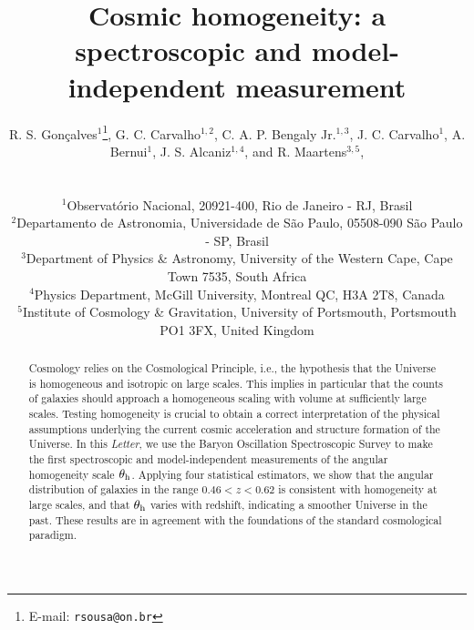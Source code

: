 \documentclass[useAMS,usenatbib]{mn2e}
\begin{document}
\title[Cosmic homogeneity: a spectroscopic and model-independent measurement]{Cosmic homogeneity: a spectroscopic and model-independent measurement}

\author[R. S. Gon\c{c}alves et al.]%
{
 \parbox{\textwidth}{
  R. S. Gon\c{c}alves$^{1}$\thanks{E-mail: \texttt{rsousa@on.br}},
  G. C. Carvalho$^{1,2}$,
  C. A. P. Bengaly Jr.$^{1,3}$,
  J. C. Carvalho$^{1}$,
  A. Bernui$^{1}$,
  J. S. Alcaniz$^{1,4}$,
  and
  R. Maartens$^{3,5}$,
 }
 \vspace{0.4cm}\\
 \parbox{\textwidth}{
  $^{1}$Observat\'orio Nacional, 20921-400, Rio de Janeiro - RJ, Brasil\\
  $^{2}$Departamento de Astronomia, Universidade de S\~ao Paulo, 05508-090 S\~ao Paulo - SP, Brasil\\
  $^{3}$Department of Physics \& Astronomy, University of the Western Cape, Cape Town 7535, South Africa\\
  $^{4}$Physics Department, McGill University, Montreal QC, H3A 2T8, Canada\\
  $^{5}$Institute of Cosmology \& Gravitation, University of Portsmouth, Portsmouth PO1 3FX, United Kingdom\\
 }
}






\pagerange{\pageref{firstpage}--\pageref{lastpage}}


\maketitle

\label{firstpage}

\begin{abstract}
Cosmology relies on the Cosmological Principle, i.e., the hypothesis that the Universe is homogeneous and isotropic on large scales. This implies in particular that the counts of galaxies should approach a homogeneous scaling with volume at sufficiently large scales. Testing homogeneity is crucial to obtain a correct interpretation of the physical assumptions underlying the current cosmic acceleration and structure formation of the Universe. In this {\em Letter}, we use the Baryon Oscillation Spectroscopic Survey to make the first spectroscopic and model-independent measurements of the angular homogeneity scale $\theta_{\rm h}$. Applying four statistical estimators, we show that the angular distribution of galaxies in the range $0.46 < z < 0.62$ is consistent with homogeneity at large scales, and that $\theta_{\rm h}$ varies with redshift, indicating a smoother Universe in the past. These results are in agreement with the foundations of the standard cosmological paradigm.
\end{abstract}
\end{document}
